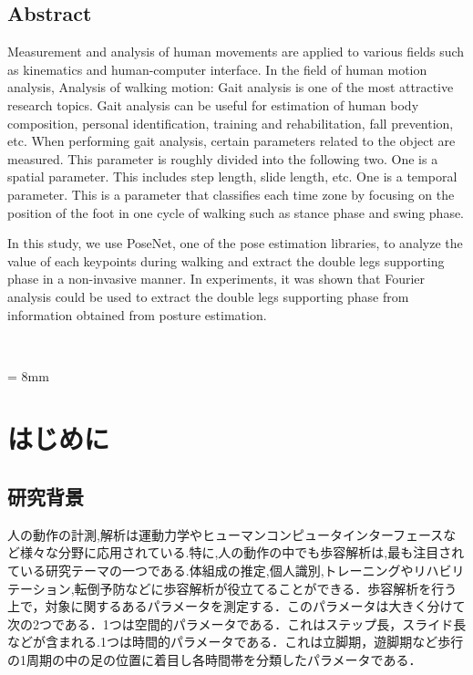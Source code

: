 \documentclass[a4j,10.5pt]{jreport}
\begin{document}
\section*{Abstract}
Measurement and analysis of human movements are applied to various fields such as kinematics and human-computer interface. In the field of human motion analysis, Analysis of walking motion: Gait analysis is one of the most attractive research topics. Gait analysis can be useful for estimation of human body composition, personal identification, training and rehabilitation, fall prevention, etc. When performing gait analysis, certain parameters related to the object are measured. This parameter is roughly divided into the following two. One is a spatial parameter. This includes step length, slide length, etc. One is a temporal parameter. This is a parameter that classifies each time zone by focusing on the position of the foot in one cycle of walking such as stance phase and swing phase.

In this study, we use PoseNet, one of the pose estimation libraries, to analyze the value of each keypoints during walking and extract the double legs supporting phase in a non-invasive manner. In experiments, it was shown that Fourier analysis could be used to extract the double legs supporting phase from information obtained from posture estimation.

\tableofcontents

\listoftables %

\listoffigures　%

\baselineskip = 8mm

\clearpage




\chapter{はじめに}
\section{研究背景}
人の動作の計測,解析は運動力学やヒューマンコンピュータインターフェースなど様々な分野に応用されている.特に,人の動作の中でも歩容解析は,最も注目されている研究テーマの一つである.体組成の推定,個人識別,トレーニングやリハビリテーション,転倒予防などに歩容解析が役立てることができる．歩容解析を行う上で，対象に関するあるパラメータを測定する．このパラメータは大きく分けて次の2つである．1つは空間的パラメータである．これはステップ長，スライド長などが含まれる.1つは時間的パラメータである．これは立脚期，遊脚期\cite{cite1}など歩行の1周期の中の足の位置に着目し各時間帯を分類したパラメータである．
\end{document}
